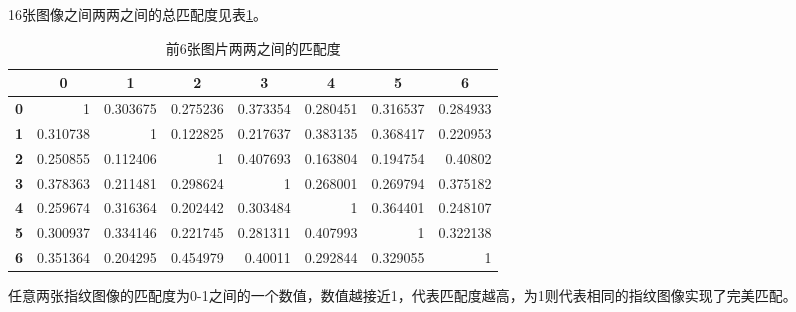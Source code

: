 \documentclass[withoutpreface,bwprint]{cumcmthesis} %
\begin{document}
16张图像之间两两之间的总匹配度见表\ref{tab:similarityTab}。
\begin{table}[htbp]
	\centering
	\caption{前6张图片两两之间的匹配度}
	  \begin{tabular}{crrrrrrr}
	  \toprule
			& \multicolumn{1}{c}{\textbf{0}} & \multicolumn{1}{c}{\textbf{1}} & \multicolumn{1}{c}{\textbf{2}} & \multicolumn{1}{c}{\textbf{3}} & \multicolumn{1}{c}{\textbf{4}} & \multicolumn{1}{c}{\textbf{5}} & \multicolumn{1}{c}{\textbf{6}} \\
	  \midrule
	  \textbf{0} & 1     & 0.303675 & 0.275236 & 0.373354 & 0.280451 & 0.316537 & 0.284933 \\
	  \textbf{1} & 0.310738 & 1     & 0.122825 & 0.217637 & 0.383135 & 0.368417 & 0.220953 \\
	  \textbf{2} & 0.250855 & 0.112406 & 1     & 0.407693 & 0.163804 & 0.194754 & 0.40802 \\
	  \textbf{3} & 0.378363 & 0.211481 & 0.298624 & 1     & 0.268001 & 0.269794 & 0.375182 \\
	  \textbf{4} & 0.259674 & 0.316364 & 0.202442 & 0.303484 & 1     & 0.364401 & 0.248107 \\
	  \textbf{5} & 0.300937 & 0.334146 & 0.221745 & 0.281311 & 0.407993 & 1     & 0.322138 \\
	  \textbf{6} & 0.351364 & 0.204295 & 0.454979 & 0.40011 & 0.292844 & 0.329055 & 1 \\
	  \bottomrule
	  \end{tabular}%
	\label{tab:similarityTab}%
  \end{table}%
  任意两张指纹图像的匹配度为0-1之间的一个数值，数值越接近1，代表匹配度越高，为1则代表相同的指纹图像实现了完美匹配。
\end{document}
